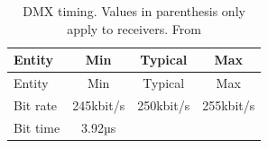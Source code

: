 \hypertarget{tbl:dmx-timing}{}
\begin{longtable}[]{@{}lccc@{}}
\caption[DMX timing]{\label{tbl:dmx-timing}DMX timing. Values in parenthesis only
apply to receivers. From \citep{esta-dmx512-a} }\tabularnewline
\toprule
\begin{minipage}[b]{0.31\columnwidth}\raggedright\strut
Entity\strut
\end{minipage} & \begin{minipage}[b]{0.18\columnwidth}\centering\strut
Min\strut
\end{minipage} & \begin{minipage}[b]{0.18\columnwidth}\centering\strut
Typical\strut
\end{minipage} & \begin{minipage}[b]{0.18\columnwidth}\centering\strut
Max\strut
\end{minipage}\tabularnewline
\midrule
\endfirsthead
\toprule
\begin{minipage}[b]{0.31\columnwidth}\raggedright\strut
Entity\strut
\end{minipage} & \begin{minipage}[b]{0.18\columnwidth}\centering\strut
Min\strut
\end{minipage} & \begin{minipage}[b]{0.18\columnwidth}\centering\strut
Typical\strut
\end{minipage} & \begin{minipage}[b]{0.18\columnwidth}\centering\strut
Max\strut
\end{minipage}\tabularnewline
\midrule
\endhead
\begin{minipage}[t]{0.31\columnwidth}\raggedright\strut
Bit rate\strut
\end{minipage} & \begin{minipage}[t]{0.18\columnwidth}\centering\strut
245kbit/s\strut
\end{minipage} & \begin{minipage}[t]{0.18\columnwidth}\centering\strut
250kbit/s\strut
\end{minipage} & \begin{minipage}[t]{0.18\columnwidth}\centering\strut
255kbit/s\strut
\end{minipage}\tabularnewline
\begin{minipage}[t]{0.31\columnwidth}\raggedright\strut
Bit time\strut
\end{minipage} & \begin{minipage}[t]{0.18\columnwidth}\centering\strut
3.92µs\strut
\end{minipage} & \begin{minipage}[t]{0.18\columnwidth}\centering\strut

\end{minipage}
\end{longtable}
